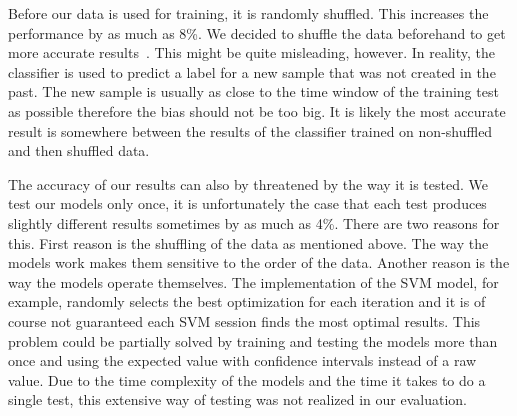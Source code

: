 Before our data is used for training, it is randomly shuffled. This increases the performance by as much as 8\%. We decided to shuffle the data beforehand to get more accurate results~. This might be quite misleading, however. In reality, the classifier is used to predict a label for a new sample that was not created in the past. The new sample is usually as close to the time window of the training test as possible therefore the bias should not be too big. It is likely the most accurate result is somewhere between the results of the classifier trained on non-shuffled and then shuffled data.

The accuracy of our results can also by threatened by the way it is tested. We test our models only once, it is unfortunately the case that each test produces slightly different results sometimes by as much as 4\%. There are two reasons for this. First reason is the shuffling of the data as mentioned above. The way the models work makes them sensitive to the order of the data. Another reason is the way the models operate themselves. The implementation of the SVM model, for example, randomly selects the best optimization for each iteration and it is of course not guaranteed each SVM session finds the most optimal results. This problem could be partially solved by training and testing the models more than once and using the expected value with confidence intervals instead of a raw value. Due to the time complexity of the models and the time it takes to do a single test, this extensive way of testing was not realized in our evaluation.